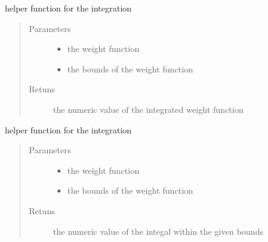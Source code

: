 \documentclass[letterpaper,10pt,english,openany,oneside]{sphinxmanual}
\begin{document}
\begin{fulllineitems}
\label{\detokenize{index:term.integrateFromDict}}
helper function for the integration
\begin{quote}\begin{description}
\item[{Parameters}] \leavevmode\begin{itemize}
\item {} 
 \textendash{} the weight function

\item {} 
 \textendash{} the bounds of the weight function

\end{itemize}

\item[{Retuns}] \leavevmode
the numeric value of the integrated weight function

\end{description}\end{quote}

\end{fulllineitems}


\begin{fulllineitems}
\label{\detokenize{index:term.symbolicToNumeric}}
helper function for the integration
\begin{quote}\begin{description}
\item[{Parameters}] \leavevmode\begin{itemize}
\item {} 
 \textendash{} the weight function

\item {} 
 \textendash{} the bounds of the weight function

\end{itemize}

\item[{Retuns}] \leavevmode
the numeric value of the integal within the given bounds

\end{description}\end{quote}

\end{fulllineitems}
\end{document}
